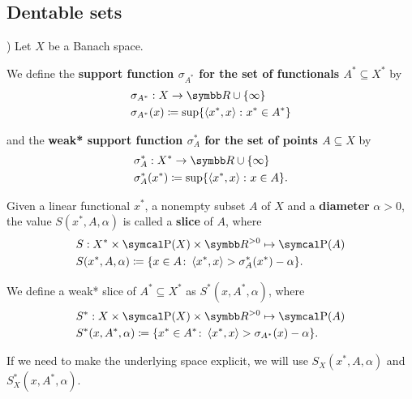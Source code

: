\subsection{Dentable sets}\label{subsec:dentable_sets}

\begin{definition}\cite[example 3.2(a)]{Phelps1993})
  \label{def:banach_support_function}
  Let \( X \) be a Banach space.

  We define the \textbf{support function \( \sigma_{A^*} \) for the set of functionals \( A^* \subseteq X^* \)} by
  \begin{align*}
    &\sigma_{A^*}: X \to \R \cup \{ \infty \} \\
    &\sigma_{A^*}(x) \coloneqq \sup \{ \Prod {x^*} x \colon x^* \in A^* \}
  \end{align*}

  and the \textbf{weak* support function \( \sigma^*_A \) for the set of points \( A \subseteq X \)} by
  \begin{align*}
    &\sigma^*_A: X^* \to \R \cup \{ \infty \} \\
    &\sigma^*_A(x^*) \coloneqq \sup \{ \Prod {x^*} x \colon x \in A \}.
  \end{align*}
\end{definition}

\begin{definition}\cite[definition 2.17]{Phelps1993}
  \label{def:banach_slice}
  Given a linear functional \( x^* \), a nonempty subset \( A \) of \( X \) and a \textbf{diameter} \( \alpha > 0 \), the value \( S(x^*, A, \alpha) \) is called a \textbf{slice} of \( A \), where
  \begin{align*}
    &S: X^* \times \Power(X) \times \R^{>0} \mapsto \Power(A) \\
    &S(x^*, A, \alpha) \coloneqq \{ x \in A \colon \Prod {x^*} x > \sigma_A^*(x^*) - \alpha \}.
  \end{align*}

  We define a weak* slice of \( A^* \subseteq X^* \) as \( S^*(x, A^*, \alpha) \), where
  \begin{align*}
    &S^*: X \times \Power(X) \times \R^{>0} \mapsto \Power(A) \\
    &S^*(x, A^*, \alpha) \coloneqq \{ x^* \in A^* \colon \Prod {x^*} x > \sigma_{A^*}(x) - \alpha \}.
  \end{align*}

  If we need to make the underlying space explicit, we will use \( S_X(x^*, A, \alpha) \) and \( S_X^*(x, A^*, \alpha) \).
\end{definition}

